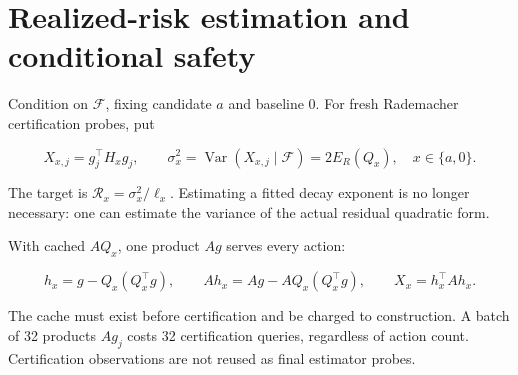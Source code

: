 \section{Realized-risk estimation and conditional safety}\label{sec:certification}
Condition on $\mathcal F$, fixing candidate $a$ and baseline $0$. For fresh Rademacher certification probes, put


\begin{equation}
X_{x,j}=g_j^\top H_xg_j,\qquad
\sigma_x^2=\operatorname{Var}(X_{x,j}\mid\mathcal F)=2E_R(Q_x),\quad x\in\{a,0\}.
\end{equation}


The target is $\mathcal R_x=\sigma_x^2/\ell_x$. Estimating a fitted decay exponent is no longer necessary: one can estimate the variance of the actual residual quadratic form.


With cached $AQ_x$, one product $Ag$ serves every action:


\begin{equation}
h_x=g-Q_x(Q_x^\top g),\qquad
Ah_x=Ag-AQ_x(Q_x^\top g),\qquad X_x=h_x^\top Ah_x.
\end{equation}


The cache must exist before certification and be charged to construction. A batch of 32 products $Ag_j$ costs 32 certification queries, regardless of action count. Certification observations are not reused as final estimator probes.


